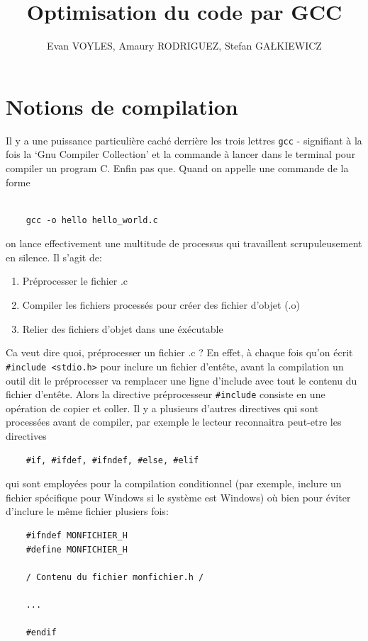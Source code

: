 \documentclass[11pt]{article} %
\title{Optimisation du code par GCC}
\author{Evan VOYLES, Amaury RODRIGUEZ, Stefan GA\L KIEWICZ}
\begin{document}
\maketitle

\section*{Notions de compilation}
Il y a une puissance particuli\`ere caché derrière les trois lettres \verb|gcc| - signifiant à la fois
la `Gnu Compiler Collection' et la commande à lancer dans le terminal pour compiler un program C. Enfin pas que.
Quand on appelle une commande de la forme
\begin{verbatim}

    gcc -o hello hello_world.c
\end{verbatim}
on lance effectivement une multitude de processus qui travaillent scrupuleusement en silence.
Il s'agit de:
\begin{enumerate}
    \item Préprocesser le fichier .c
    \item Compiler les fichiers processés pour créer des fichier d'objet (.o)
    \item Relier des fichiers d'objet dans une éxécutable
\end{enumerate}

Ca veut dire quoi, préprocesser un fichier .c ? En effet, à chaque fois qu'on
écrit \verb|#include <stdio.h>| pour inclure un fichier d'entête, avant la compilation
un outil dit le préprocesser va remplacer une ligne d'include avec tout le contenu du fichier d'entête.
Alors la directive préprocesseur \verb|#include| consiste en une opération de copier et coller. Il y a plusieurs d'autres directives qui sont processées avant de compiler,
par exemple le lecteur reconnaitra peut-etre les directives
\begin{verbatim}
    #if, #ifdef, #ifndef, #else, #elif
\end{verbatim}
qui sont employées
pour la compilation conditionnel (par exemple, inclure un fichier spécifique pour Windows si le système est Windows)
où bien pour éviter d'inclure le même fichier plusiers fois:
\begin{verbatim}
    #ifndef MONFICHIER_H
    #define MONFICHIER_H

    / Contenu du fichier monfichier.h /

    ...

    #endif
\end{verbatim}
\end{document}
